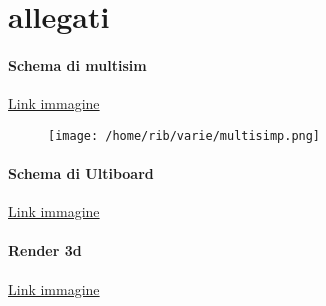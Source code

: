 \documentclass{article}
\begin{document}
\section{allegati} %
\paragraph{Schema di multisim}
\href{https://drive.google.com/file/d/1VOPnspiu-4T2ZOR6uaUWNH1DUEd0fUcg/view?usp=sharing}{Link immagine}
\begin{figure}[H]
   \centering
        \texttt{[image: /home/rib/varie/multisimp.png]}
       \label{multisimp}
\end{figure}

\paragraph{Schema di Ultiboard}
\href{https://drive.google.com/file/d/1ZlJ_AIXvgzdlvAawX5noBu48i03zm5dP/view?usp=sharing}{Link immagine}

\paragraph{Render 3d}
\href{https://drive.google.com/file/d/1EMIzjUSU50ij58dLTjCctJGQM4YIgIii/view?usp=sharing}{Link immagine}
\end{document}
